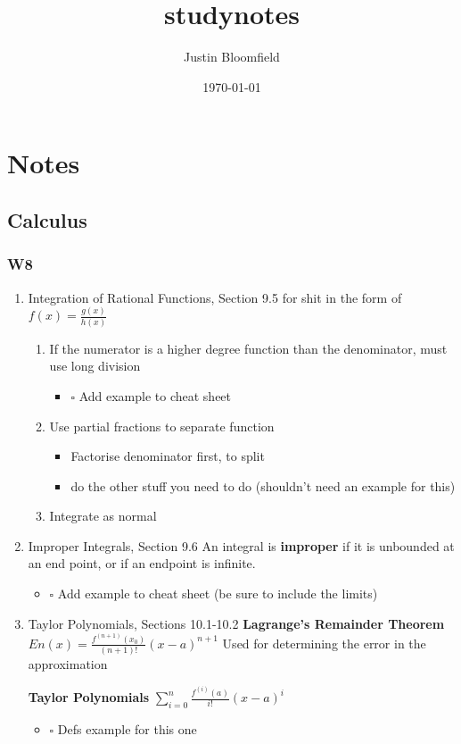 \documentclass[11pt]{article}
\author{Justin Bloomfield}
\date{\today}
\title{studynotes}
\begin{document}
\maketitle
\section{Notes}
\label{sec-1}
\subsection{Calculus}
\label{sec-1-1}
\subsubsection{W8}
\label{sec-1-1-1}
\begin{enumerate}
\item Integration of Rational Functions, Section 9.5
\label{sec-1-1-1-1}
for shit in the form of $f(x)=\frac{g(x)}{h(x)}$
\begin{enumerate}
\item If the numerator is a higher degree function than the denominator, must use long division
\begin{itemize}
\item $\square$ Add example to cheat sheet
\end{itemize}
\item Use partial fractions to separate function
\begin{itemize}
\item Factorise denominator first, to split
\item do the other stuff you need to do (shouldn't need an example for this)
\end{itemize}
\item Integrate as normal
\end{enumerate}
\item Improper Integrals, Section 9.6
\label{sec-1-1-1-2}
An integral is \textbf{improper} if it is unbounded at an end point, or if an endpoint is infinite.
\begin{itemize}
\item $\square$ Add example to cheat sheet (be sure to include the limits)
\end{itemize}
\item Taylor Polynomials, Sections 10.1-10.2
\label{sec-1-1-1-3}
\textbf{Lagrange's Remainder Theorem}
$En(x)= \frac{f^{(n+1)}(x_{0})}{(n+1)!}(x-a)^{n+1}$
Used for determining the error in the approximation

\textbf{Taylor Polynomials}
$\sum^{n}_{i=0}\frac{f^{(i)}(a)}{i!}(x-a)^{i}$

\begin{itemize}
\item $\square$ Defs example for this one
\end{itemize}
\end{enumerate}
\end{document}
